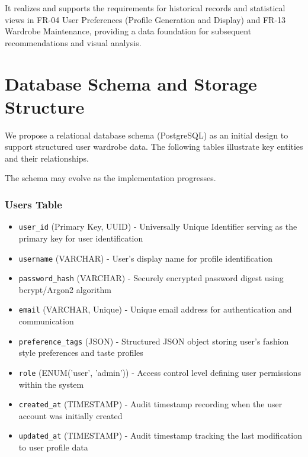 It realizes and supports the requirements for historical records and statistical views in FR-04 User Preferences (Profile Generation and Display) and FR-13 Wardrobe Maintenance, providing a data foundation for subsequent recommendations and visual analysis.\\

\newpage

\section{Database Schema and Storage Structure}
We propose a relational database schema (PostgreSQL) as an initial design to support structured user wardrobe data. The following tables illustrate key entities and their relationships.

The schema may evolve as the implementation progresses.


\subsubsection{Users Table}
\begin{itemize}
    \item \texttt{user\_id} (Primary Key, UUID) - Universally Unique Identifier serving as the primary key for user identification
    \item \texttt{username} (VARCHAR) - User's display name for profile identification
    \item \texttt{password\_hash} (VARCHAR) - Securely encrypted password digest using bcrypt/Argon2 algorithm
    \item \texttt{email} (VARCHAR, Unique) - Unique email address for authentication and communication
    \item \texttt{preference\_tags} (JSON) - Structured JSON object storing user's fashion style preferences and taste profiles
    \item \texttt{role} (ENUM('user', 'admin')) - Access control level defining user permissions within the system
    \item \texttt{created\_at} (TIMESTAMP) - Audit timestamp recording when the user account was initially created
    \item \texttt{updated\_at} (TIMESTAMP) - Audit timestamp tracking the last modification to user profile data
\end{itemize}


